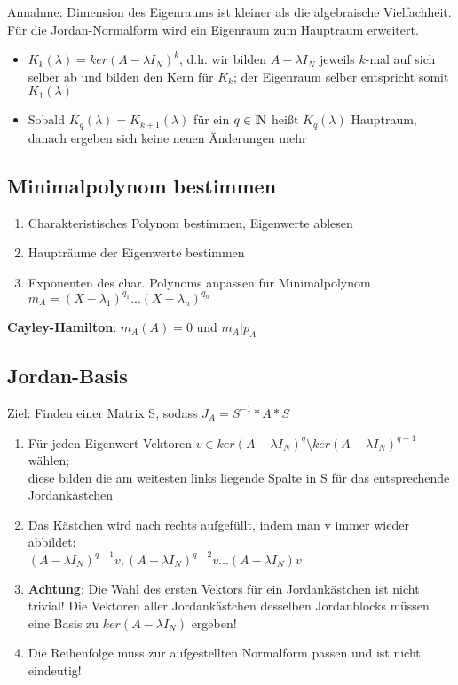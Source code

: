 \documentclass[10pt,a4paper]{article}
\def\naturalnumbers{{\rm I\!N}}
\begin{document}
	Annahme: Dimension des Eigenraums ist kleiner als die algebraische Vielfachheit. Für die Jordan-Normalform wird ein Eigenraum zum Hauptraum erweitert.
	\begin{itemize}
		\item $K_k(\lambda) = ker(A - \lambda I_N)^k$, d.h. wir bilden $A - \lambda I_N$ jeweils $k$-mal auf sich selber ab und bilden den Kern für $K_k$; der Eigenraum selber entspricht somit $K_1(\lambda)$
		\item Sobald $K_q(\lambda) = K_{k + 1}(\lambda)$ für ein $q \in \naturalnumbers$ heißt $K_q(\lambda)$ Hauptraum, danach ergeben sich keine neuen Änderungen mehr
	\end{itemize}
	
	\subsection{Minimalpolynom bestimmen}
	\label{jd:sub:minimalpolynom_bestimmen}
	
	\begin{enumerate}
		\item Charakteristisches Polynom bestimmen, Eigenwerte ablesen
		\item Haupträume der Eigenwerte bestimmen
		\item Exponenten des char. Polynoms anpassen für Minimalpolynom $m_A = (X - \lambda_1)^{q_1} ... (X - \lambda_n)^{q_n}$
	\end{enumerate}
	\textbf{Cayley-Hamilton}: $m_A(A) = 0$ und $m_A|p_A$

	\newpage
	\subsection{Jordan-Basis}
	\label{jd:sub:jordan_basis}
	
	Ziel: Finden einer Matrix S, sodass $J_A = S^{-1} * A * S$
	\begin{enumerate}
		\item Für jeden Eigenwert Vektoren $v \in ker(A - \lambda I_N)^q \setminus ker(A - \lambda I_N)^{q - 1}$ wählen;\\diese bilden die am weitesten links liegende Spalte in S für das entsprechende Jordankästchen
		\item Das Kästchen wird nach rechts aufgefüllt, indem man v immer wieder abbildet:\\$(A - \lambda I_N)^{q - 1}v, (A - \lambda I_N)^{q - 2}v ... (A - \lambda I_N)v$
		\item \textbf{Achtung}: Die Wahl des ersten Vektors für ein Jordankästchen ist nicht trivial! Die Vektoren aller Jordankästchen desselben Jordanblocks müssen eine Basis zu $ker(A - \lambda I_N)$ ergeben!
		\item Die Reihenfolge muss zur aufgestellten Normalform passen und ist nicht eindeutig!
	\end{enumerate}
\end{document}
